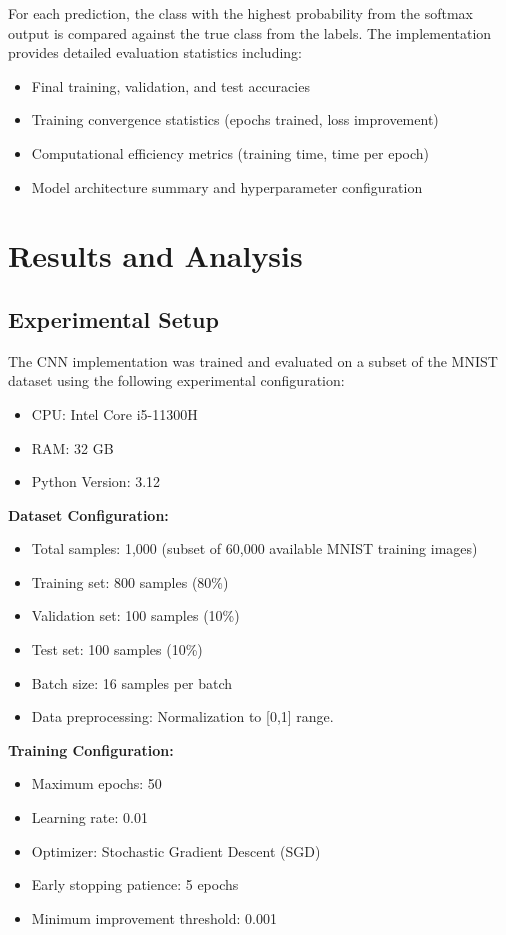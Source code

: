 \documentclass[conference]{IEEEtran}
\begin{document}
For each prediction, the class with the highest probability from the softmax output is compared against the true class from the labels. The implementation provides detailed evaluation statistics including:
\begin{itemize}
\item Final training, validation, and test accuracies
\item Training convergence statistics (epochs trained, loss improvement)
\item Computational efficiency metrics (training time, time per epoch)
\item Model architecture summary and hyperparameter configuration
\end{itemize}

\section{Results and Analysis}
\subsection{Experimental Setup}
The CNN implementation was trained and evaluated on a subset of the MNIST dataset using the following experimental configuration:
\begin{itemize}
    \item CPU: Intel Core i5-11300H
    \item RAM: 32 GB
    \item Python Version: 3.12
\end{itemize}

\textbf{Dataset Configuration:}
\begin{itemize}
\item Total samples: 1,000 (subset of 60,000 available MNIST training images)
\item Training set: 800 samples (80\%)
\item Validation set: 100 samples (10\%)
\item Test set: 100 samples (10\%)
\item Batch size: 16 samples per batch
\item Data preprocessing: Normalization to [0,1] range.
\end{itemize}

\textbf{Training Configuration:}
\begin{itemize}
\item Maximum epochs: 50
\item Learning rate: 0.01
\item Optimizer: Stochastic Gradient Descent (SGD)
\item Early stopping patience: 5 epochs
\item Minimum improvement threshold: 0.001
\end{itemize}
\end{document}

